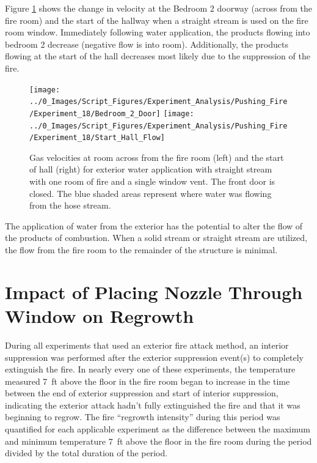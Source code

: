 \documentclass[12pt,oneside]{book}
\begin{document}
Figure \ref{fig:push_fire_SS_BR2} shows the change in velocity at the Bedroom 2 doorway (across from the fire room) and the start of the hallway when a straight stream is used on the fire room window. Immediately following water application, the products flowing into bedroom 2 decrease (negative flow is into room). Additionally, the products flowing at the start of the hall decreases most likely due to the suppression of the fire. 

\begin{figure}[H]
\centering
\texttt{[image: ../0\_Images/Script\_Figures/Experiment\_Analysis/Pushing\_Fire/Experiment\_18/Bedroom\_2\_Door]}
\texttt{[image: ../0\_Images/Script\_Figures/Experiment\_Analysis/Pushing\_Fire/Experiment\_18/Start\_Hall\_Flow]}
\caption[Gas Velocities - Single Room of Fire - Exterior Straight Stream]{Gas velocities at room across from the fire room (left) and the start of hall (right) for exterior water application with straight stream with one room of fire and a single window vent. The front door is closed. The blue shaded areas represent where water was flowing from the hose stream. }
\label{fig:push_fire_SS_BR2}
\end{figure}

The application of water from the exterior has the potential to alter the flow of the products of combustion. When a solid stream or straight stream are utilized, the flow from the fire room to the remainder of the structure is minimal.  

\section{Impact of Placing Nozzle Through Window on Regrowth}
During all experiments that used an exterior fire attack method, an interior suppression was performed after the exterior suppression event(s) to completely extinguish the fire. In nearly every one of these experiments, the temperature measured 7~ft above the floor in the fire room began to increase in the time between the end of exterior suppression and start of interior suppression, indicating the exterior attack hadn't fully extinguished the fire and that it was beginning to regrow. The fire ``regrowth intensity'' during this period was quantified for each applicable experiment as the difference between the maximum and minimum temperature 7~ft above the floor in the fire room during the period divided by the total duration of the period.
\end{document}

